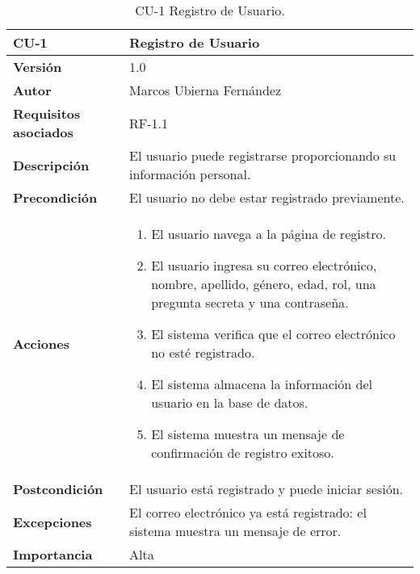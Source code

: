 \begin{table}[p]
	\centering
	\begin{tabularx}{\linewidth}{ p{} p{} }
		\toprule
		\textbf{CU-1}    & \textbf{Registro de Usuario}\\
		\toprule
		\textbf{Versión}              & 1.0    \\
		\textbf{Autor}                & Marcos Ubierna Fernández \\
		\textbf{Requisitos asociados} & RF-1.1 \\
		\textbf{Descripción}          & El usuario puede registrarse proporcionando su información personal. \\
		\textbf{Precondición}         & El usuario no debe estar registrado previamente. \\
		\textbf{Acciones}             &
		\begin{enumerate}
			\def\labelenumi{\arabic{enumi}.}
			\tightlist
			\item El usuario navega a la página de registro.
			\item El usuario ingresa su correo electrónico, nombre, apellido, género, edad, rol, una pregunta secreta y una contraseña.
                \item El sistema verifica que el correo electrónico no esté registrado.
                \item El sistema almacena la información del usuario en la base de datos.
                \item El sistema muestra un mensaje de confirmación de registro exitoso.
		\end{enumerate}\\
		\textbf{Postcondición}        & El usuario está registrado y puede iniciar sesión. \\
		\textbf{Excepciones}          & El correo electrónico ya está registrado: el sistema muestra un mensaje de error. \\
		\textbf{Importancia}          & Alta \\
		\bottomrule
	\end{tabularx}
	\caption{CU-1  Registro de Usuario.}
\end{table}

